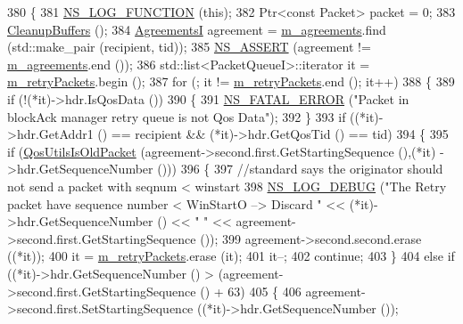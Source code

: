 \begin{DoxyCode}
380 \{
381   \hyperlink{log-macros-disabled_8h_a90b90d5bad1f39cb1b64923ea94c0761}{NS\_LOG\_FUNCTION} (\textcolor{keyword}{this});
382   Ptr<const Packet> packet = 0;
383   \hyperlink{classns3_1_1BlockAckManager_a27603e1b5ff9a9f5922b1056c75733e1}{CleanupBuffers} ();
384   \hyperlink{classns3_1_1BlockAckManager_acbd1cf7c5f3487150955c3a4c9d04102}{AgreementsI} agreement = \hyperlink{classns3_1_1BlockAckManager_a952a6b8b29705c83ba6464f7cf7ffe66}{m\_agreements}.find (std::make\_pair (recipient, tid));
385   \hyperlink{assert_8h_a6dccdb0de9b252f60088ce281c49d052}{NS\_ASSERT} (agreement != \hyperlink{classns3_1_1BlockAckManager_a952a6b8b29705c83ba6464f7cf7ffe66}{m\_agreements}.end ());
386   std::list<PacketQueueI>::iterator it = \hyperlink{classns3_1_1BlockAckManager_a2851f947dd68945ebc25961cff893ed9}{m\_retryPackets}.begin ();
387   \textcolor{keywordflow}{for} (; it != \hyperlink{classns3_1_1BlockAckManager_a2851f947dd68945ebc25961cff893ed9}{m\_retryPackets}.end (); it++)
388     \{
389       \textcolor{keywordflow}{if} (!(*it)->hdr.IsQosData ())
390         \{
391           \hyperlink{group__fatal_ga5131d5e3f75d7d4cbfd706ac456fdc85}{NS\_FATAL\_ERROR} (\textcolor{stringliteral}{"Packet in blockAck manager retry queue is not Qos Data"});
392         \}
393       \textcolor{keywordflow}{if} ((*it)->hdr.GetAddr1 () == recipient && (*it)->hdr.GetQosTid () == tid)
394         \{
395           \textcolor{keywordflow}{if} (\hyperlink{group__wifi_ga5cb9ea723837c5a036e622612f2d0bb0}{QosUtilsIsOldPacket} (agreement->second.first.GetStartingSequence (),(*it)
      ->hdr.GetSequenceNumber ()))
396             \{
397               \textcolor{comment}{//standard says the originator should not send a packet with seqnum < winstart}
398               \hyperlink{group__logging_ga413f1886406d49f59a6a0a89b77b4d0a}{NS\_LOG\_DEBUG} (\textcolor{stringliteral}{"The Retry packet have sequence number < WinStartO --> Discard "} <<
       (*it)->hdr.GetSequenceNumber () << \textcolor{stringliteral}{" "} << agreement->second.first.GetStartingSequence ());
399               agreement->second.second.erase ((*it));
400               it = \hyperlink{classns3_1_1BlockAckManager_a2851f947dd68945ebc25961cff893ed9}{m\_retryPackets}.erase (it);
401               it--;
402               \textcolor{keywordflow}{continue};
403             \}
404           \textcolor{keywordflow}{else} \textcolor{keywordflow}{if} ((*it)->hdr.GetSequenceNumber () > (agreement->second.first.GetStartingSequence () + 63) 
405             \{
406               agreement->second.first.SetStartingSequence ((*it)->hdr.GetSequenceNumber ());

\end{DoxyCode}
